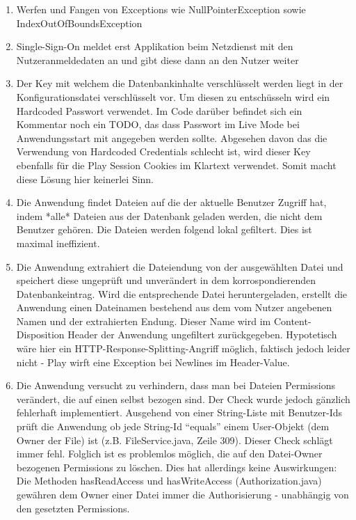 \documentclass[12pt,DIV14,BCOR10mm,a4paper,parskip=half-,headsepline,headinclude,english,ngerman,bibliography=totocnumbered]{scrreprt}
\begin{document}
\begin{enumerate}
\begin{enumerate}
  \item Werfen und Fangen von Exceptions wie NullPointerException sowie IndexOutOfBoundsException
  \item Single-Sign-On meldet erst Applikation beim Netzdienst mit den Nutzeranmeldedaten an und gibt diese dann an den Nutzer weiter
  \item Der Key mit welchem die Datenbankinhalte verschlüsselt werden liegt in der Konfigurationsdatei verschlüsselt vor. Um diesen zu entschüsseln wird ein Hardcoded Passwort verwendet. Im Code darüber befindet sich ein Kommentar noch ein TODO, das dass Passwort im Live Mode bei Anwendungsstart mit angegeben werden sollte. Abgesehen davon das die Verwendung von Hardcoded Credentials schlecht ist, wird dieser Key ebenfalls für die Play Session Cookies im Klartext verwendet. Somit macht diese Lösung hier keinerlei Sinn.
  \item Die Anwendung findet Dateien auf die der aktuelle Benutzer Zugriff hat, indem *alle* Dateien aus der Datenbank geladen werden, die nicht dem Benutzer gehören. Die Dateien werden folgend lokal gefiltert. Dies ist maximal ineffizient.
  \item Die Anwendung extrahiert die Dateiendung von der ausgewählten Datei und speichert diese ungeprüft und unverändert in dem korrospondierenden Datenbankeintrag. Wird die entsprechende Datei heruntergeladen, erstellt die Anwendung einen Dateinamen bestehend aus dem vom Nutzer angebenen Namen und der extrahierten Endung. Dieser Name wird im Content-Disposition Header der Anwendung ungefiltert zurückgegeben. Hypotetisch wäre hier ein HTTP-Response-Splitting-Angriff möglich, faktisch jedoch leider nicht - Play wirft eine Exception bei Newlines im Header-Value.
  \item Die Anwendung versucht zu verhindern, dass man bei Dateien Permissions verändert, die auf einen selbst bezogen sind. Der Check wurde jedoch gänzlich fehlerhaft implementiert. Ausgehend von einer String-Liste mit Benutzer-Ids prüft die Anwendung ob jede String-Id \enquote{equals} einem User-Objekt (dem Owner der File) ist (z.B. FileService.java, Zeile 309). Dieser Check schlägt immer fehl. Folglich ist es problemlos möglich, die auf den Datei-Owner bezogenen Permissions zu löschen. Dies hat allerdings keine Auswirkungen: Die Methoden hasReadAccess und hasWriteAccess (Authorization.java) gewähren dem Owner einer Datei immer die Authorisierung - unabhängig von den gesetzten Permissions.

\end{enumerate}
\end{enumerate}
\end{document}
